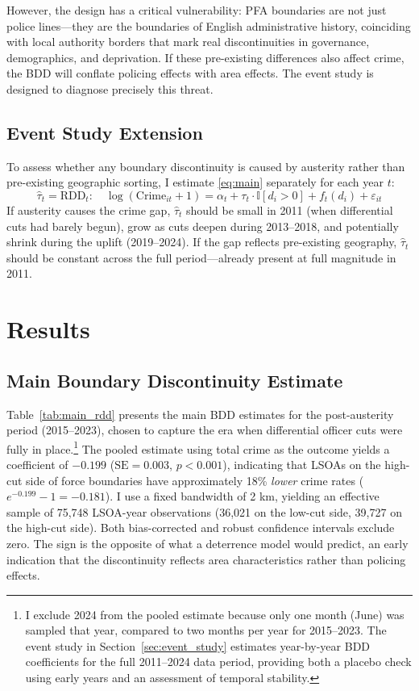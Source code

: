 \documentclass[12pt]{article}
\newcommand{\ind}{\mathbb{I}}
\begin{document}
However, the design has a critical vulnerability: PFA boundaries are not just police lines---they are the boundaries of English administrative history, coinciding with local authority borders that mark real discontinuities in governance, demographics, and deprivation. If these pre-existing differences also affect crime, the BDD will conflate policing effects with area effects. The event study is designed to diagnose precisely this threat.

\subsection{Event Study Extension}

To assess whether any boundary discontinuity is caused by austerity rather than pre-existing geographic sorting, I estimate \eqref{eq:main} separately for each year $t$:
\begin{equation}
\hat{\tau}_t = \text{RDD}_{t}: \quad \log(\text{Crime}_{it} + 1) = \alpha_t + \tau_t \cdot \ind[d_i > 0] + f_t(d_i) + \varepsilon_{it}
\end{equation}
If austerity causes the crime gap, $\hat{\tau}_t$ should be small in 2011 (when differential cuts had barely begun), grow as cuts deepen during 2013--2018, and potentially shrink during the uplift (2019--2024). If the gap reflects pre-existing geography, $\hat{\tau}_t$ should be constant across the full period---already present at full magnitude in 2011.


\section{Results}

\subsection{Main Boundary Discontinuity Estimate}

Table~\ref{tab:main_rdd} presents the main BDD estimates for the post-austerity period (2015--2023), chosen to capture the era when differential officer cuts were fully in place.\footnote{I exclude 2024 from the pooled estimate because only one month (June) was sampled that year, compared to two months per year for 2015--2023. The event study in Section~\ref{sec:event_study} estimates year-by-year BDD coefficients for the full 2011--2024 data period, providing both a placebo check using early years and an assessment of temporal stability.} The pooled estimate using total crime as the outcome yields a coefficient of $-0.199$ ($\text{SE} = 0.003$, $p < 0.001$), indicating that LSOAs on the high-cut side of force boundaries have approximately 18\% \textit{lower} crime rates ($e^{-0.199} - 1 = -0.181$). I use a fixed bandwidth of 2 km, yielding an effective sample of 75,748 LSOA-year observations (36,021 on the low-cut side, 39,727 on the high-cut side). Both bias-corrected and robust confidence intervals exclude zero. The sign is the opposite of what a deterrence model would predict, an early indication that the discontinuity reflects area characteristics rather than policing effects.
\end{document}
